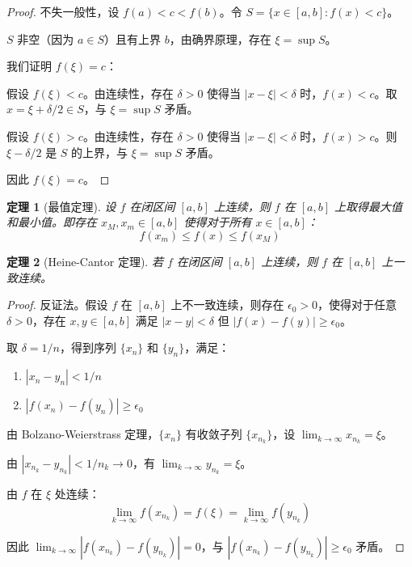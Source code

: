 \documentclass[12pt]{article}
\newtheorem{theorem}{定理}[section]
\begin{document}
\begin{proof}
不失一般性，设 $f(a) < c < f(b)$。令 $S = \{x \in [a, b] : f(x) < c\}$。

$S$ 非空（因为 $a \in S$）且有上界 $b$，由确界原理，存在 $\xi = \sup S$。

我们证明 $f(\xi) = c$：

假设 $f(\xi) < c$。由连续性，存在 $\delta > 0$ 使得当 $|x - \xi| < \delta$ 时，$f(x) < c$。取 $x = \xi + \delta/2 \in S$，与 $\xi = \sup S$ 矛盾。

假设 $f(\xi) > c$。由连续性，存在 $\delta > 0$ 使得当 $|x - \xi| < \delta$ 时，$f(x) > c$。则 $\xi - \delta/2$ 是 $S$ 的上界，与 $\xi = \sup S$ 矛盾。

因此 $f(\xi) = c$。
\end{proof}

\begin{theorem}[最值定理]
设 $f$ 在闭区间 $[a, b]$ 上连续，则 $f$ 在 $[a, b]$ 上取得最大值和最小值。即存在 $x_M, x_m \in [a, b]$ 使得对于所有 $x \in [a, b]$：
$$f(x_m) \leq f(x) \leq f(x_M)$$
\end{theorem}

\begin{theorem}[Heine-Cantor 定理]
若 $f$ 在闭区间 $[a, b]$ 上连续，则 $f$ 在 $[a, b]$ 上一致连续。
\end{theorem}

\begin{proof}
反证法。假设 $f$ 在 $[a, b]$ 上不一致连续，则存在 $\epsilon_0 > 0$，使得对于任意 $\delta > 0$，存在 $x, y \in [a, b]$ 满足 $|x - y| < \delta$ 但 $|f(x) - f(y)| \geq \epsilon_0$。

取 $\delta = 1/n$，得到序列 $\{x_n\}$ 和 $\{y_n\}$，满足：
\begin{enumerate}
\item $|x_n - y_n| < 1/n$
\item $|f(x_n) - f(y_n)| \geq \epsilon_0$
\end{enumerate}

由 Bolzano-Weierstrass 定理，$\{x_n\}$ 有收敛子列 $\{x_{n_k}\}$，设 $\lim_{k \to \infty} x_{n_k} = \xi$。

由 $|x_{n_k} - y_{n_k}| < 1/n_k \to 0$，有 $\lim_{k \to \infty} y_{n_k} = \xi$。

由 $f$ 在 $\xi$ 处连续：
$$\lim_{k \to \infty} f(x_{n_k}) = f(\xi) = \lim_{k \to \infty} f(y_{n_k})$$

因此 $\lim_{k \to \infty} |f(x_{n_k}) - f(y_{n_k})| = 0$，与 $|f(x_{n_k}) - f(y_{n_k})| \geq \epsilon_0$ 矛盾。
\end{proof}
\end{document}
